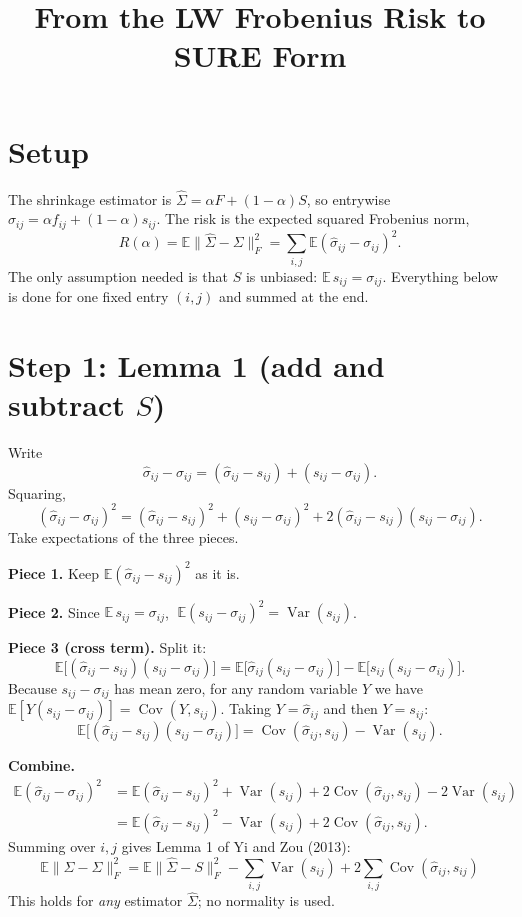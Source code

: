 \documentclass[11pt]{article}
\title{From the LW Frobenius Risk to SURE Form}
\author{}
\date{}
\begin{document}
\maketitle
\vspace{-2em}

\section*{Setup}
The shrinkage estimator is $\hat\Sigma = \alpha F + (1-\alpha)S$, so entrywise
$\hat\sigma_{ij} = \alpha f_{ij} + (1-\alpha)s_{ij}$. The risk is the expected squared Frobenius norm,
\[
R(\alpha) = \mathbb{E}\|\hat\Sigma-\Sigma\|_F^2 = \sum_{i,j}\mathbb{E}(\hat\sigma_{ij}-\sigma_{ij})^2 .
\]
The only assumption needed is that $S$ is unbiased: $\mathbb{E}\,s_{ij}=\sigma_{ij}$.
Everything below is done for one fixed entry $(i,j)$ and summed at the end.

\section*{Step 1: Lemma 1 (add and subtract $S$)}
Write
\[
\hat\sigma_{ij}-\sigma_{ij} = (\hat\sigma_{ij}-s_{ij}) + (s_{ij}-\sigma_{ij}).
\]
Squaring,
\[
(\hat\sigma_{ij}-\sigma_{ij})^2 = (\hat\sigma_{ij}-s_{ij})^2 + (s_{ij}-\sigma_{ij})^2 + 2(\hat\sigma_{ij}-s_{ij})(s_{ij}-\sigma_{ij}).
\]
Take expectations of the three pieces.

\textbf{Piece 1.} Keep $\mathbb{E}(\hat\sigma_{ij}-s_{ij})^2$ as it is.

\textbf{Piece 2.} Since $\mathbb{E}\,s_{ij}=\sigma_{ij}$,
$\;\mathbb{E}(s_{ij}-\sigma_{ij})^2 = \operatorname{Var}(s_{ij})$.

\textbf{Piece 3 (cross term).} Split it:
\[
\mathbb{E}\big[(\hat\sigma_{ij}-s_{ij})(s_{ij}-\sigma_{ij})\big]
= \mathbb{E}\big[\hat\sigma_{ij}(s_{ij}-\sigma_{ij})\big] - \mathbb{E}\big[s_{ij}(s_{ij}-\sigma_{ij})\big].
\]
Because $s_{ij}-\sigma_{ij}$ has mean zero, for any random variable $Y$ we have
$\mathbb{E}[Y(s_{ij}-\sigma_{ij})] = \operatorname{Cov}(Y,s_{ij})$. Taking $Y=\hat\sigma_{ij}$ and then $Y=s_{ij}$:
\[
\mathbb{E}\big[(\hat\sigma_{ij}-s_{ij})(s_{ij}-\sigma_{ij})\big]
= \operatorname{Cov}(\hat\sigma_{ij},s_{ij}) - \operatorname{Var}(s_{ij}).
\]

\textbf{Combine.}
\begin{align*}
\mathbb{E}(\hat\sigma_{ij}-\sigma_{ij})^2
&= \mathbb{E}(\hat\sigma_{ij}-s_{ij})^2 + \operatorname{Var}(s_{ij})
   + 2\operatorname{Cov}(\hat\sigma_{ij},s_{ij}) - 2\operatorname{Var}(s_{ij}) \\
&= \mathbb{E}(\hat\sigma_{ij}-s_{ij})^2 - \operatorname{Var}(s_{ij})
   + 2\operatorname{Cov}(\hat\sigma_{ij},s_{ij}).
\end{align*}
Summing over $i,j$ gives Lemma 1 of Yi and Zou (2013):
\[
\boxed{\;\mathbb{E}\|\hat\Sigma-\Sigma\|_F^2
= \mathbb{E}\|\hat\Sigma-S\|_F^2 - \sum_{i,j}\operatorname{Var}(s_{ij})
+ 2\sum_{i,j}\operatorname{Cov}(\hat\sigma_{ij},s_{ij})\;}
\]
This holds for \emph{any} estimator $\hat\Sigma$; no normality is used.
\end{document}
